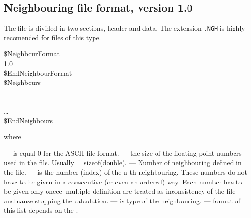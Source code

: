 %
%
%
%

\subsection{Neighbouring file format, version 1.0}
The file is divided in two sections, header and data.
The extension {\tt .NGH} is highly recomended for files of this type.
\begin{fileformat}
\$NeighbourFormat\\
  1.0  \\
\$EndNeighbourFormat\\
\$Neighbours\\
  \\
    \\
  \dots\\
\$EndNeighbours\\
\end{fileformat}
where
\begin{description}
  --- is equal 0 for the ASCII file format.
  --- the size of the floating point numbers used in
  the file. Usually  = sizeof(double).
  --- Number of neighbouring defined in the
  file.
  --- is the number (index) of the n-th
  neighbouring. These numbers do not have to be given in a consecutive (or even an
  ordered) way. Each number has to be given only onece, multiple definition
  are treated as inconsistency of the file and cause stopping the
  calculation.
  --- is type of the neighbouring. 
  --- format of this list depends on the
  .
\end{description}
